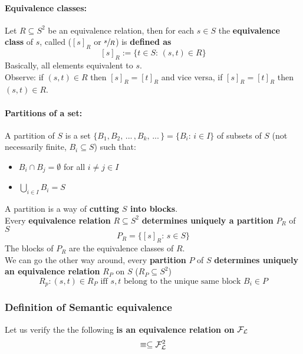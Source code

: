 \documentclass[11pt]{article}
\begin{document}
	\paragraph{Equivalence classes:} Let $R \subseteq S^2$ be an equivalence relation, then for each $s \in S$ the \textbf{equivalence class} of $s$, called ($[s]_R$ or $\sfrac{s}{R}$) is \textbf{defined as}
	$$ [s]_R := \{t \in S: \, (s,t) \in R\} $$
	Basically, all elements equivalent to $s$.\\
	
	Observe: if $(s,t) \in R$ then $[s]_R = [t]_R$ and vice versa, if $[s]_R = [t]_R$ then $(s,t) \in R$.
	
	\newpage
	
	\paragraph{Partitions of a set:} A partition of $S$ is a set $\{B_1, B_2, \, ... \, , B_k , \, ... \, \} = \{B_i : \, i \in  I\}$ of subsets of $S$ (not necessarily finite, $B_i \subseteq S$) such that:
	\begin{itemize}
		\item $B_i \cap B_j = \emptyset$ for all $i \neq j \in I$
		\item $\bigcup_{i \in I} B_i = S$
	\end{itemize}
	
	A partition is a way of \textbf{cutting $S$ into blocks}.\\
%	
%	

	Every \textbf{equivalence relation} $R \subseteq S^2$ \textbf{determines uniquely a partition} $P_R$ of $S$ 
	$$ P_R = \{[s]_R : \, s \in S \}$$
	The blocks of $P_R$ are the equivalence classes of $R$.\\
	
	We can go the other way around, every \textbf{partition} $P$ of $S$ \textbf{determines uniquely an equivalence relation} $R_P$ on $S$ ($R_P \subseteq S^2$)
	$$ R_p : (s,t) \in R_P \text{ iff } s,t \text{ belong to the unique same block } B_i \in P$$
	
	\nn
	
	\subsubsection{Definition of Semantic equivalence}
	Let us verify the the following \textbf{is an equivalence relation on} $\mathcal{F}_\mathcal{L}$
	$$ \equiv \subseteq \mathcal{F}_\mathcal{L}^2$$
	
\end{document}
